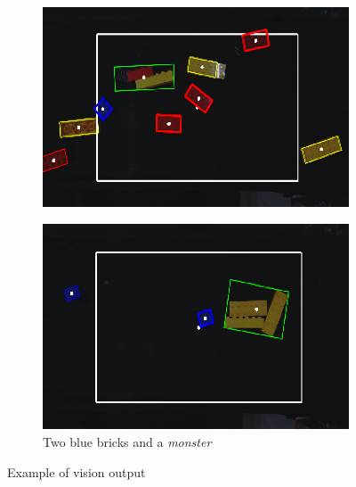   	\begin{figure}[H]
        \centering
        \begin{subfigure}{0.45\textwidth}
            \includegraphics[width=\textwidth]{figs/rc_vision_ex1}
            \caption{}
            \label{fig:rc_vision_ex1}
        \end{subfigure}
        \hspace{10pt}
        \begin{subfigure}{0.45\textwidth}
            \includegraphics[width=\textwidth]{figs/rc_vision_ex2}
            \caption{Two blue bricks and a \textit{monster}}
            \label{fig:rc_vision_ex2}
    \end{subfigure}
    \caption{Example of vision output}
    \end{figure}